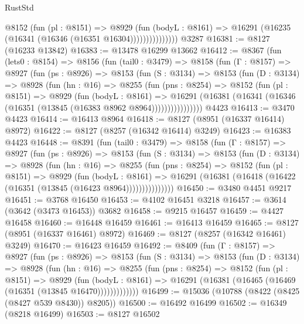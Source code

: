 \begin{lexlean}{RustStd}
\begin{coremodule}
                    @8152
                      (fun (pl : @8151) =>
                      @8929
                        (fun (bodyL : @8161) =>
                        @16291 (@16235 (@16341 (@16346 (@16351 @16304)))))))))))))))
    @3287
@16381 := @8127 (@16233 @13842)
@16383 := @13478 @16299 @13662
@16412 := @8367
    (fun (lets0 : @8154) =>
    @8156
      (fun (tail0 : @3479) =>
      @8158
        (fun (Γ : @8157) =>
        @8927
          (fun (ps : @8926) =>
          @8153
            (fun (S : @3134) =>
            @8153
              (fun (D : @3134) =>
              @8928
                (fun (hn : @16) =>
                @8255
                  (fun (pns : @8254) =>
                  @8152
                    (fun (pl : @8151) =>
                    @8929
                      (fun (bodyL : @8161) =>
                      @16291
                        (@16381 (@16341 (@16346 (@16351 (@13845 (@16383 @8962 @8964))))))))))))))))
    @4423
@16413 := @3470 @4423
@16414 := @16413 @8964
@16418 := @8127 (@8951 (@16337 @16414) @8972)
@16422 := @8127 (@8257 (@16342 @16414) @3249)
@16423 := @16383 @4423
@16448 := @8391
    (fun (tail0 : @3479) =>
    @8158
      (fun (Γ : @8157) =>
      @8927
        (fun (ps : @8926) =>
        @8153
          (fun (S : @3134) =>
          @8153
            (fun (D : @3134) =>
            @8928
              (fun (hn : @16) =>
              @8255
                (fun (pns : @8254) =>
                @8152
                  (fun (pl : @8151) =>
                  @8929
                    (fun (bodyL : @8161) =>
                    @16291 (@16381 (@16418 (@16422 (@16351 (@13845 (@16423 @8964)))))))))))))))
@16450 := @3480 @4451 @9217
@16451 := @3768 @16450
@16453 := @4102 @16451 @3218
@16457 := @3614 (@3642 (@3473 @16453)) @3682
@16458 := @9215 @16457
@16459 := @4427 @16458
@16460 := @16448 @16459
@16461 := @16413 @16459
@16465 := @8127 (@8951 (@16337 @16461) @8972)
@16469 := @8127 (@8257 (@16342 @16461) @3249)
@16470 := @16423 @16459
@16492 := @8409
    (fun (Γ : @8157) =>
    @8927
      (fun (ps : @8926) =>
      @8153
        (fun (S : @3134) =>
        @8153
          (fun (D : @3134) =>
          @8928
            (fun (hn : @16) =>
            @8255
              (fun (pns : @8254) =>
              @8152
                (fun (pl : @8151) =>
                @8929
                  (fun (bodyL : @8161) =>
                  @16291 (@16381 (@16465 (@16469 (@16351 (@13845 @16470)))))))))))))
@16499 := @15036 (@10788 (@8422 (@8425 (@8427 @539 @8430)) @8205))
@16500 := @16492 @16499
@16502 := @16349 (@8218 @16499)
@16503 := @8127 @16502

\end{coremodule}
\end{lexlean}
